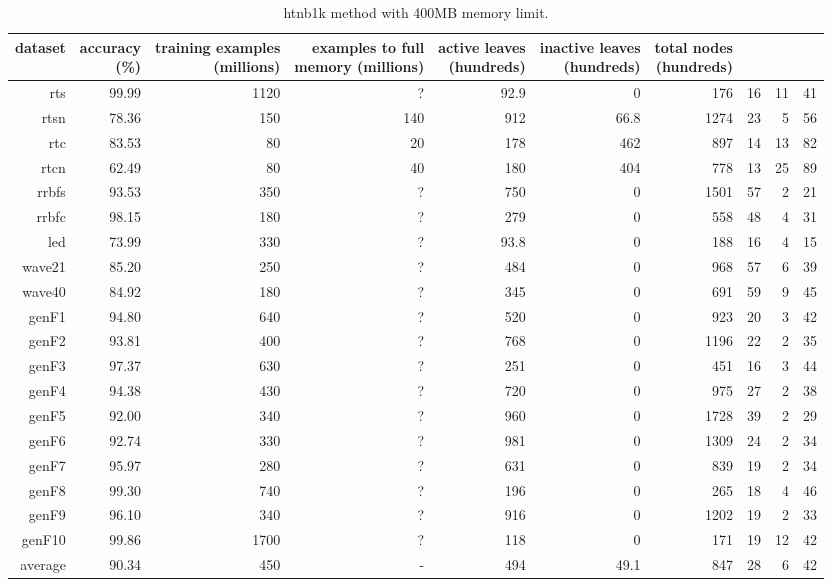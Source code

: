 \clearpage
\begin{table}
\caption{{\sc htnb1k} method with 400MB memory limit.}
\label{tab:htnb1k-400MB}
\centering
\begin{tabular}{|r|r|r|r|r|r|r|r|r|r|}
\hline
dataset	&
\rotatebox{90}{\parbox{9em}{accuracy\\(\%)}} &
\rotatebox{90}{\parbox{9em}{training examples\\(millions)}} &
\rotatebox{90}{\parbox{9em}{examples to full\\memory (millions)}} &
\rotatebox{90}{\parbox{9em}{active leaves\\(hundreds)}} &
\rotatebox{90}{\parbox{9em}{inactive leaves\\(hundreds)}} &
\rotatebox{90}{\parbox{9em}{total nodes\\(hundreds)}} &
\rotatebox{90}{\parbox{9em}{tree depth}}	&
\rotatebox{90}{\parbox{9em}{training speed (\%)}} &
\rotatebox{90}{\parbox{9em}{prediction speed (\%)}} \\
\hline
{\sc rts} & 99.99 & 1120 & ? & 92.9 & 0 & 176 & 16 & 11 & 41 \\
{\sc rtsn} & 78.36 & 150 & 140 & 912 & 66.8 & 1274 & 23 & 5 & 56 \\
{\sc rtc} & 83.53 & 80 & 20 & 178 & 462 & 897 & 14 & 13 & 82 \\
{\sc rtcn} & 62.49 & 80 & 40 & 180 & 404 & 778 & 13 & 25 & 89 \\
{\sc rrbfs} & 93.53 & 350 & ? & 750 & 0 & 1501 & 57 & 2 & 21 \\
{\sc rrbfc} & 98.15 & 180 & ? & 279 & 0 & 558 & 48 & 4 & 31 \\
{\sc led} & 73.99 & 330 & ? & 93.8 & 0 & 188 & 16 & 4 & 15 \\
{\sc wave21} & 85.20 & 250 & ? & 484 & 0 & 968 & 57 & 6 & 39 \\
{\sc wave40} & 84.92 & 180 & ? & 345 & 0 & 691 & 59 & 9 & 45 \\
{\sc genF1} & 94.80 & 640 & ? & 520 & 0 & 923 & 20 & 3 & 42 \\
{\sc genF2} & 93.81 & 400 & ? & 768 & 0 & 1196 & 22 & 2 & 35 \\
{\sc genF3} & 97.37 & 630 & ? & 251 & 0 & 451 & 16 & 3 & 44 \\
{\sc genF4} & 94.38 & 430 & ? & 720 & 0 & 975 & 27 & 2 & 38 \\
{\sc genF5} & 92.00 & 340 & ? & 960 & 0 & 1728 & 39 & 2 & 29 \\
{\sc genF6} & 92.74 & 330 & ? & 981 & 0 & 1309 & 24 & 2 & 34 \\
{\sc genF7} & 95.97 & 280 & ? & 631 & 0 & 839 & 19 & 2 & 34 \\
{\sc genF8} & 99.30 & 740 & ? & 196 & 0 & 265 & 18 & 4 & 46 \\
{\sc genF9} & 96.10 & 340 & ? & 916 & 0 & 1202 & 19 & 2 & 33 \\
{\sc genF10} & 99.86 & 1700 & ? & 118 & 0 & 171 & 19 & 12 & 42 \\
\hline
average & 90.34 & 450 &  -  & 494 & 49.1 & 847 & 28 & 6 & 42 \\
\hline
\end{tabular}
\end{table}
